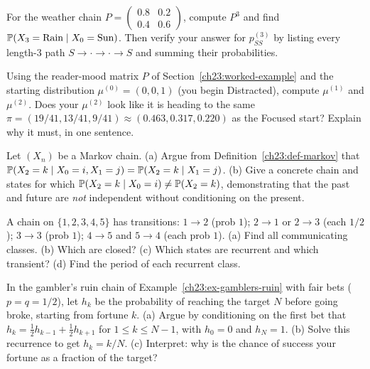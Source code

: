 \begin{exercise}
\label{ch23:ex-twostep}
For the weather chain $P = \left(\begin{smallmatrix} 0.8 & 0.2 \\ 0.4 & 0.6 \end{smallmatrix}\right)$,
compute $P^3$ and find $\operatorname{\mathbb{P}}(X_3 = \text{Rain} \mid X_0 = \text{Sun})$. Then verify your
answer for $p_{SS}^{(3)}$ by listing every length-$3$ path $S \to \cdot \to \cdot \to S$ and
summing their probabilities.
\end{exercise}

\begin{exercise}
\label{ch23:ex-push}
Using the reader-mood matrix $P$ of Section~\ref{ch23:worked-example} and the starting
distribution $\mu^{(0)} = (0,0,1)$ (you begin Distracted), compute $\mu^{(1)}$ and
$\mu^{(2)}$. Does your $\mu^{(2)}$ look like it is heading to the same $\pi = (19/41,
13/41, 9/41) \approx (0.463, 0.317, 0.220)$ as the Focused start? Explain why it must, in one sentence.
\end{exercise}

\begin{exercise}
\label{ch23:ex-memoryless}
Let $(X_n)$ be a Markov chain. (a) Argue from Definition~\ref{ch23:def-markov} that
$\operatorname{\mathbb{P}}(X_2 = k \mid X_0 = i, X_1 = j) = \operatorname{\mathbb{P}}(X_2 = k \mid X_1 = j)$. (b) Give a concrete chain
and states for which $\operatorname{\mathbb{P}}(X_2 = k \mid X_0 = i) \ne \operatorname{\mathbb{P}}(X_2 = k)$, demonstrating that the
past and future are \emph{not} independent without conditioning on the present.
\end{exercise}

\begin{exercise}
\label{ch23:ex-classify}
A chain on $\{1,2,3,4,5\}$ has transitions: $1 \to 2$ (prob $1$); $2 \to 1$ or $2 \to 3$
(each $1/2$); $3 \to 3$ (prob $1$); $4 \to 5$ and $5 \to 4$ (each prob $1$). (a) Find all
communicating classes. (b) Which are closed? (c) Which states are recurrent and which
transient? (d) Find the period of each recurrent class.
\end{exercise}

\begin{exercise}
\label{ch23:ex-ruin}
In the gambler's ruin chain of Example~\ref{ch23:ex-gamblers-ruin} with fair bets
($p = q = 1/2$), let $h_k$ be the probability of reaching the target $N$ before going broke,
starting from fortune $k$. (a) Argue by conditioning on the first bet that
$h_k = \tfrac12 h_{k-1} + \tfrac12 h_{k+1}$ for $1 \le k \le N-1$, with $h_0 = 0$ and
$h_N = 1$. (b) Solve this recurrence to get $h_k = k/N$. (c) Interpret: why is the chance of
success your fortune as a fraction of the target?
\end{exercise}

